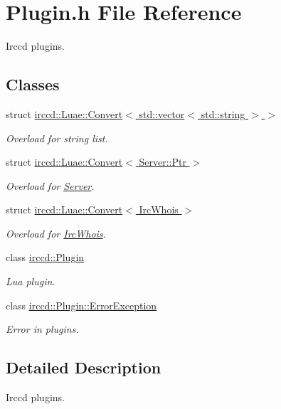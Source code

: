 \hypertarget{a00121}{\section{Plugin.\-h File Reference}
\label{a00121}
}


Irccd plugins.  


\subsection*{Classes}
\begin{DoxyCompactItemize}
\item 
struct \hyperlink{a00016}{irccd\-::\-Luae\-::\-Convert$<$ std\-::vector$<$ std\-::string $>$ $>$}
\begin{DoxyCompactList}\small\item\em Overload for string list. \end{DoxyCompactList}\item 
struct \hyperlink{a00014}{irccd\-::\-Luae\-::\-Convert$<$ Server\-::\-Ptr $>$}
\begin{DoxyCompactList}\small\item\em Overload for \hyperlink{a00055}{Server}. \end{DoxyCompactList}\item 
struct \hyperlink{a00012}{irccd\-::\-Luae\-::\-Convert$<$ Irc\-Whois $>$}
\begin{DoxyCompactList}\small\item\em Overload for \hyperlink{a00036}{Irc\-Whois}. \end{DoxyCompactList}\item 
class \hyperlink{a00051}{irccd\-::\-Plugin}
\begin{DoxyCompactList}\small\item\em Lua plugin. \end{DoxyCompactList}\item 
class \hyperlink{a00027}{irccd\-::\-Plugin\-::\-Error\-Exception}
\begin{DoxyCompactList}\small\item\em Error in plugins. \end{DoxyCompactList}\end{DoxyCompactItemize}


\subsection{Detailed Description}
Irccd plugins. 